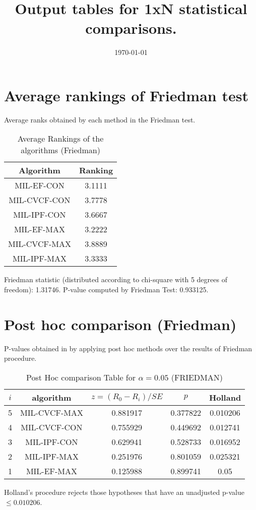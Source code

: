 \documentclass[a4paper,10pt]{article}
\title{Output tables for 1xN statistical comparisons.}
\author{}
\date{\today}
\begin{document}
\begin{landscape}
\pagestyle{empty}
\maketitle
\thispagestyle{empty}

\section{Average rankings of Friedman test}


Average ranks obtained by each method in the Friedman test.

\begin{table}[!htp]
\centering
\begin{tabular}{|c|c|}\hline
Algorithm&Ranking\\\hline
MIL-EF-CON&3.1111\\MIL-CVCF-CON&3.7778\\MIL-IPF-CON&3.6667\\MIL-EF-MAX&3.2222\\MIL-CVCF-MAX&3.8889\\MIL-IPF-MAX&3.3333\\\hline\end{tabular}
\caption{Average Rankings of the algorithms (Friedman)}
\end{table}

Friedman statistic (distributed according to chi-square with 5 degrees of freedom): 1.31746. \newline P-value computed by Friedman Test: 0.933125.\newline


\newpage

\section{Post hoc comparison (Friedman)}


P-values obtained in by applying post hoc methods over the results of Friedman procedure.

\begin{table}[!htp]
\centering\footnotesize
\begin{tabular}{ccccc}
$i$&algorithm&$z=(R_0 - R_i)/SE$&$p$&Holland\\
\hline5&MIL-CVCF-MAX&0.881917&0.377822&0.010206\\4&MIL-CVCF-CON&0.755929&0.449692&0.012741\\3&MIL-IPF-CON&0.629941&0.528733&0.016952\\2&MIL-IPF-MAX&0.251976&0.801059&0.025321\\1&MIL-EF-MAX&0.125988&0.899741&0.05\\\hline
\end{tabular}
\caption{Post Hoc comparison Table for $\alpha=0.05$ (FRIEDMAN)}
\end{table}Holland's procedure rejects those hypotheses that have an unadjusted p-value $\le0.010206$.



\end{landscape}
\end{document}
